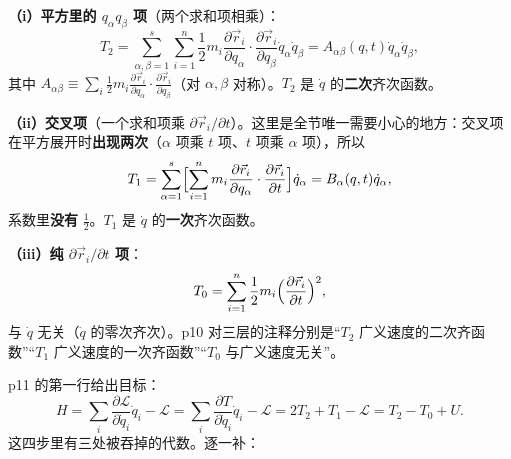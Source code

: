 \documentclass[11pt]{ctexart}
\begin{document}
\textbf{（i）平方里的 $q_\alpha q_\beta$ 项}（两个求和项相乘）：
\[
T_2=\sum_{\alpha,\beta=1}^{s}\sum_{i=1}^{n}\frac12m_i\frac{\partial\vec r_i}{\partial q_\alpha}\cdot\frac{\partial\vec r_i}{\partial q_\beta}\dot q_\alpha\dot q_\beta
=A_{\alpha\beta}(q,t)\dot q_\alpha\dot q_\beta ,
\]
其中 $A_{\alpha\beta}\equiv\sum_i\frac12m_i\frac{\partial\vec r_i}{\partial q_\alpha}\cdot\frac{\partial\vec r_i}{\partial q_\beta}$（对 $\alpha,\beta$ 对称）。$T_2$ 是 $\dot q$ 的\textbf{二次}齐次函数。

\textbf{（ii）交叉项}（一个求和项乘 $\partial\vec r_i/\partial t$）。这里是全节唯一需要小心的地方：交叉项在平方展开时\textbf{出现两次}（$\alpha$ 项乘 $t$ 项、$t$ 项乘 $\alpha$ 项），所以
\[
T_1=\sum_{\alpha=1}^{s}\Bigl[\sum_{i=1}^{n}m_i\frac{\partial\vec r_i}{\partial q_\alpha}\cdot\frac{\partial\vec r_i}{\partial t}\Bigr]\dot q_\alpha
=B_\alpha(q,t)\dot q_\alpha ,
\]
系数里\textbf{没有} $\frac12$。$T_1$ 是 $\dot q$ 的\textbf{一次}齐次函数。


\textbf{（iii）纯 $\partial\vec r_i/\partial t$ 项}：
\[
T_0=\sum_{i=1}^{n}\frac12m_i\Bigl(\frac{\partial\vec r_i}{\partial t}\Bigr)^2 ,
\]
与 $\dot q$ 无关（$\dot q$ 的零次齐次）。p10 对三层的注释分别是“$T_2$ 广义速度的二次齐函数”“$T_1$ 广义速度的一次齐函数”“$T_0$ 与广义速度无关”。



p11 的第一行给出目标：
\[
H=\sum_i\frac{\partial\mathcal{L}}{\partial\dot q_i}\dot q_i-\mathcal{L}
=\sum_i\frac{\partial T}{\partial\dot q_i}\dot q_i-\mathcal{L}
=2T_2+T_1-\mathcal{L}
=T_2-T_0+U .
\]
这四步里有三处被吞掉的代数。逐一补：
\end{document}
